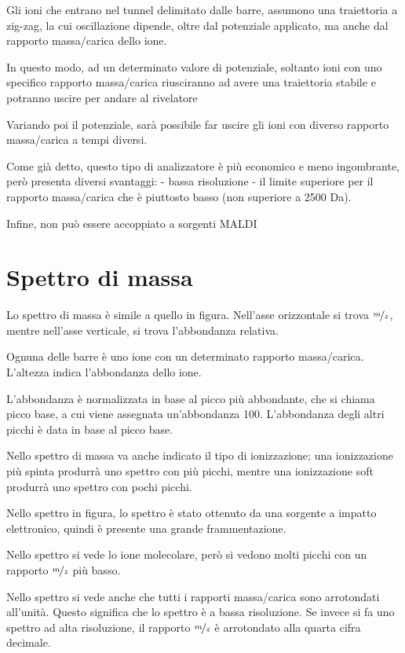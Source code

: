 Gli ioni che entrano nel tunnel delimitato dalle barre, assumono una
traiettoria a zig-zag, la cui oscillazione dipende, oltre dal potenziale
applicato, ma anche dal rapporto massa/carica dello ione.


In questo modo, ad un determinato valore di potenziale, soltanto ioni
con uno specifico rapporto massa/carica riusciranno ad avere una
traiettoria stabile e potranno uscire per andare al rivelatore

Variando poi il potenziale, sarà possibile far uscire gli ioni con
diverso rapporto massa/carica a tempi diversi.

Come già detto, questo tipo di analizzatore è più economico e meno
ingombrante, però presenta diversi svantaggi: - bassa risoluzione - il
limite superiore per il rapporto massa/carica che è piuttosto basso (non
superiore a 2500 Da).

Infine, non può essere accoppiato a sorgenti MALDI

\section{Spettro di massa}

Lo spettro di massa è simile a quello in figura. Nell'asse orizzontale
si trova $\nicefrac{m}{z}$, mentre nell'asse verticale, si trova l'abbondanza
relativa.

Ognuna delle barre è uno ione con un determinato rapporto massa/carica.
L'altezza indica l'abbondanza dello ione.

L'abbondanza è normalizzata in base al picco più abbondante, che si
chiama picco base, a cui viene assegnata un'abbondanza 100. L'abbondanza
degli altri picchi è data in base al picco base.

Nello spettro di massa va anche indicato il tipo di ionizzazione; una
ionizzazione più spinta produrrà uno spettro con più picchi, mentre una
ionizzazione soft produrrà uno spettro con pochi picchi.

Nello spettro in figura, lo spettro è stato ottenuto da una sorgente a
impatto elettronico, quindi è presente una grande frammentazione.


Nello spettro si vede lo ione molecolare, però si vedono molti picchi
con un rapporto $\nicefrac{m}{z}$ più basso.

Nello spettro si vede anche che tutti i rapporti massa/carica sono
arrotondati all'unità. Questo significa che lo spettro è a bassa
risoluzione. Se invece si fa uno spettro ad alta risoluzione, il
rapporto $\nicefrac{m}{z}$ è arrotondato alla quarta cifra decimale.

